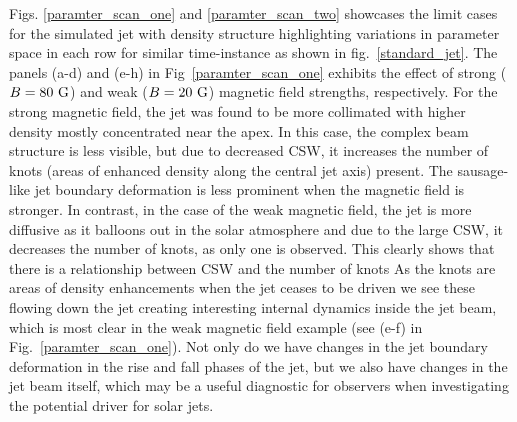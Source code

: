 \documentclass[12pt]{ociamthesis}
\newcommand{\np}{\\ \\}
\begin{document}
%
%
Figs. \ref{paramter_scan_one} and \ref{paramter_scan_two} showcases the limit cases for the simulated jet with density structure highlighting variations in parameter space in each row for similar time-instance as shown in fig.~\ref{standard_jet}. The panels (a-d) and (e-h) in Fig~\ref{paramter_scan_one} exhibits the effect of strong ($B = 80~\rm{G}$) and weak ($B = 20~\rm{G}$) magnetic field strengths, respectively. For the strong magnetic field, the jet was found to be more collimated with higher density mostly concentrated near the apex. In this case, the complex beam structure is less visible, but due to decreased CSW, it increases the number of knots (areas of enhanced density along the central jet axis) present. The sausage-like jet boundary deformation is less prominent when the magnetic field is stronger. In contrast, in the case of the weak magnetic field, the jet is more diffusive as it balloons out in the solar atmosphere and due to the large CSW, it decreases the number of knots, as only one is observed. This clearly shows that there is a relationship between CSW and the number of knots As the knots are areas of density enhancements when the jet ceases to be driven we see these flowing down the jet creating interesting internal dynamics inside the jet beam, which is most clear in the weak magnetic field example (see (e-f) in Fig.~\ref{paramter_scan_one}). Not only do we have changes in the jet boundary deformation in the rise and fall phases of the jet, but we also have changes in the jet beam itself, which may be a useful diagnostic for observers when investigating the potential driver for solar jets. \np    
%
\end{document}
